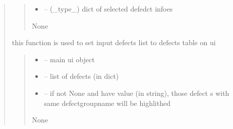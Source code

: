 \documentclass[letterpaper,10pt,english]{sphinxmanual}
\begin{document}
\begin{quote}
\begin{savenotes}
\begin{fulllineitems}
\begin{quote}
\begin{description}
\begin{itemize}
\item {} 
\sphinxAtStartPar
{} – (\_type\_) dict of selected defedct infoes

\end{itemize}

\sphinxAtStartPar
None

\end{description}\end{quote}

\end{fulllineitems}\end{savenotes}


\begin{savenotes}\begin{fulllineitems}
\label{\detokenize{setting/backend/defect_management_funcs:oxin.backend.defect_management_funcs.set_defects_on_ui}}
\pysigstartsignatures
{}
\pysigstopsignatures
\sphinxAtStartPar
this function is used to set input defects list to defects table on ui
\begin{quote}\begin{description}
\begin{itemize}
\item {} 
\sphinxAtStartPar
{} – main ui object

\item {} 
\sphinxAtStartPar
{} – list of defects (in dict)

\item {} 
\sphinxAtStartPar
{} – if not None and have value (in string), those defect s with same defect\sphinxhyphen{}group\sphinxhyphen{}name will be highlithed

\end{itemize}

\sphinxAtStartPar
None


\end{description}
\end{quote}
\end{fulllineitems}
\end{savenotes}
\end{quote}
\end{document}
